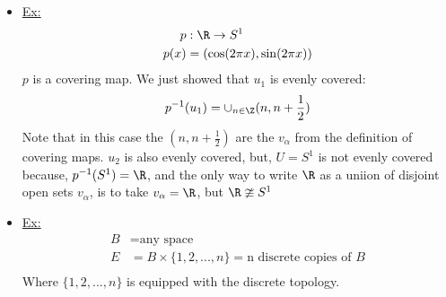     \begin{itemize}
        \item \underline{Ex:}
            \begin{align*}
                p&: \R \rightarrow S^1\\
                p(x)&=(\cos(2\pi x), \sin(2\pi x))\\
            \end{align*}
            $p$ is a covering map. We just showed that $u_1$ is evenly covered:
            \begin{align*}
                p^{-1}(u_1)=\cup_{n\in \Z}(n,n+\frac{1}{2})\\
            \end{align*}
            Note that in this case the $(n, n+\frac{1}{2})$ are the $v_\alpha$ from the definition of
            covering maps. $u_2$ is also evenly covered, but, $U=S^{1}$ is not evenly covered because,
            $p^{-1}(S^{1})=\R$, and the only way to write $\R$ as a uniion of disjoint open sets $v_\alpha$,
            is to take $v_\alpha=\R$, but $\R \ncong S^1$
        \item \underline{Ex:}
            \begin{align*}
                B&=\text{any space}\\
                E&=B\times \{1,2,...,n\}=\text{n discrete copies of $B$}\\
            \end{align*}
            Where $\{1,2,...,n\}$ is equipped with the discrete topology.
    \end{itemize}
